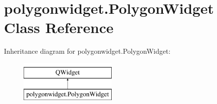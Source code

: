 \hypertarget{classpolygonwidget_1_1PolygonWidget}{}\section{polygonwidget.\+Polygon\+Widget Class Reference}
\label{classpolygonwidget_1_1PolygonWidget}
Inheritance diagram for polygonwidget.\+Polygon\+Widget\+:\begin{figure}[H]
\begin{center}
\leavevmode
\includegraphics[height=2.000000cm]{classpolygonwidget_1_1PolygonWidget}
\end{center}
\end{figure}
